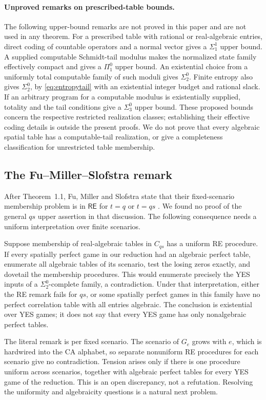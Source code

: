 \paragraph{Unproved remarks on prescribed-table bounds.}
The following upper-bound remarks are not proved in this paper and are not
used in any theorem. For a prescribed table with rational or real-algebraic entries, direct coding of countable operators and a normal vector gives a $\Sigma^1_1$ upper bound. A supplied computable Schmidt-tail modulus makes the normalized state family effectively compact and gives a $\Pi^0_1$ upper bound. An existential choice from a uniformly total computable family of such moduli gives $\Sigma^0_2$. Finite entropy also gives $\Sigma^0_2$, by \eqref{eq:entropytail} with an existential integer budget and rational slack. If an arbitrary program for a computable modulus is existentially supplied, totality and the tail conditions give a $\Sigma^0_3$ upper bound. These proposed bounds concern the respective restricted realization classes; establishing their effective coding details is outside the present proofs. We do not prove that every algebraic spatial table has a computable-tail realization, or give a completeness classification for unrestricted table membership.

\subsection{The Fu--Miller--Slofstra remark}
After Theorem~1.1, Fu, Miller and Slofstra state that their fixed-scenario membership problem is in $\mathsf{RE}$ for $t=q$ or $t=qs$ \cite{FMS}. We found no proof of the general $qs$ upper assertion in that discussion. The following consequence needs a uniform interpretation over finite scenarios.

Suppose membership of real-algebraic tables in $C_{qs}$ has a uniform RE procedure. If every spatially perfect game in our reduction had an algebraic perfect table, enumerate all algebraic tables of its scenario, test the losing zeros exactly, and dovetail the membership procedures. This would enumerate precisely the YES inputs of a $\Sigma^0_2$-complete family, a contradiction. Under that interpretation, either the RE remark fails for $qs$, or some spatially perfect games in this family have no perfect correlation table with all entries algebraic. The conclusion is existential over YES games; it does not say that every YES game has only nonalgebraic perfect tables.

The literal remark is per fixed scenario. The scenario of $G_e$ grows with $e$, which is hardwired into the CA alphabet, so separate nonuniform RE procedures for each scenario give no contradiction. Tension arises only if there is one procedure uniform across scenarios, together with algebraic perfect tables for every YES game of the reduction. This is an open discrepancy, not a refutation. Resolving the uniformity and algebraicity questions is a natural next problem.

